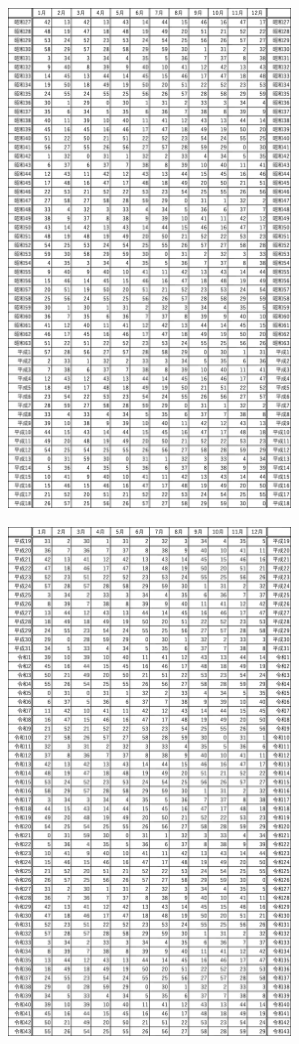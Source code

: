 \documentclass[a5paper,11pt,dvipdfmx]{tarticle}
\begin{document}
\begin{figure}[h]
  \centering
  \includegraphics[width=75mm,angle=90]{figs/table3-2-1.eps}
\end{figure}

\clearpage

\begin{figure}[h]
  \centering
  \includegraphics[width=75mm,angle=90]{figs/table3-2-2.eps}
\end{figure}
\end{document}
